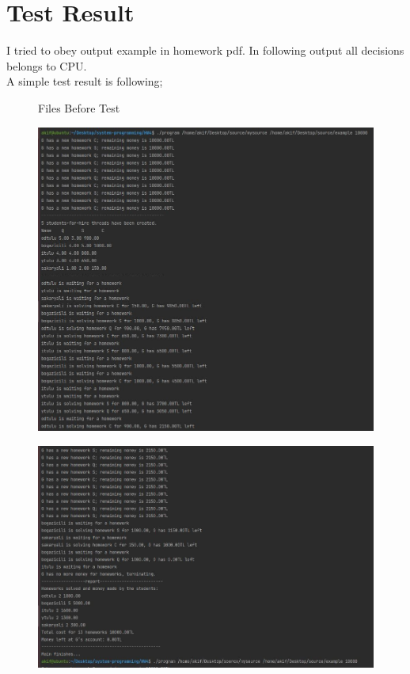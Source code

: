 \documentclass{article}
\begin{document}
\section{Test Result}
I tried to obey output example in homework pdf. In following output all decisions belongs to CPU. \\
A simple test result is following; \\
\begin{figure}[H]
    \centering
    \qquad
    \caption{Files Before Test}
    \label{fig:example}
\end{figure}
\begin{figure}[H]
\includegraphics[width=1\textwidth, left]{res1.JPG}		
\end{figure}                              
\cleardoublepage
\begin{figure}[H]
\includegraphics[width=1\textwidth, left]{res2.JPG}
\caption[Optional caption]{}
\label{}		
\end{figure}    
\end{document}
